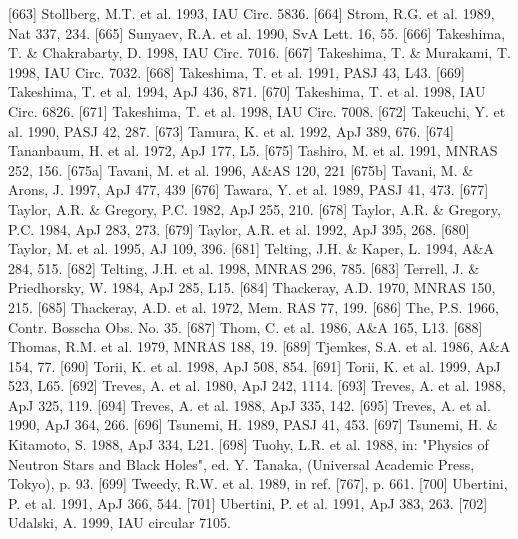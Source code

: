 \documentclass{aa}
\begin{document}
\begin{thebibliography}{}
\bibitem[]{}[663] Stollberg, M.T. et al. 1993, IAU Circ. 5836.
\bibitem[]{}[664] Strom, R.G. et al. 1989, Nat 337, 234.
\bibitem[]{}[665] Sunyaev, R.A. et al. 1990, SvA Lett. 16, 55.
\bibitem[]{}[666] Takeshima, T. \& Chakrabarty, D. 1998, IAU Circ. 7016.
\bibitem[]{}[667] Takeshima, T. \& Murakami, T. 1998, IAU Circ. 7032.
\bibitem[]{}[668] Takeshima, T. et al. 1991, PASJ 43, L43.
\bibitem[]{}[669] Takeshima, T. et al. 1994, ApJ 436, 871.
\bibitem[]{}[670] Takeshima, T. et al. 1998, IAU Circ. 6826.
\bibitem[]{}[671] Takeshima, T. et al. 1998, IAU Circ. 7008.
\bibitem[]{}[672] Takeuchi, Y. et al. 1990, PASJ 42, 287.
\bibitem[]{}[673] Tamura, K. et al. 1992, ApJ 389, 676.
\bibitem[]{}[674] Tananbaum, H. et al. 1972, ApJ 177, L5.
\bibitem[]{}[675] Tashiro, M. et al. 1991, MNRAS 252, 156.
\bibitem[]{}[675a] Tavani, M. et al. 1996, A\&AS 120, 221 
\bibitem[]{}[675b] Tavani, M. \& Arons, J. 1997, ApJ 477, 439
\bibitem[]{}[676] Tawara, Y. et al. 1989, PASJ 41, 473.
\bibitem[]{}[677] Taylor, A.R. \& Gregory, P.C. 1982, ApJ 255, 210.
\bibitem[]{}[678] Taylor, A.R. \& Gregory, P.C. 1984, ApJ 283, 273.
\bibitem[]{}[679] Taylor, A.R. et al. 1992, ApJ 395, 268.
\bibitem[]{}[680] Taylor, M. et al. 1995, AJ 109, 396.
\bibitem[]{}[681] Telting, J.H. \& Kaper, L. 1994, A\&A 284, 515.
\bibitem[]{}[682] Telting, J.H. et al. 1998, MNRAS 296, 785.
\bibitem[]{}[683] Terrell, J. \& Priedhorsky, W. 1984, ApJ 285, L15.
\bibitem[]{}[684] Thackeray, A.D. 1970, MNRAS 150, 215.
\bibitem[]{}[685] Thackeray, A.D. et al. 1972, Mem. RAS 77, 199.
\bibitem[]{}[686] The, P.S. 1966, Contr. Bosscha Obs. No. 35.
\bibitem[]{}[687] Thom, C. et al. 1986, A\&A 165, L13.
\bibitem[]{}[688] Thomas, R.M. et al. 1979, MNRAS 188, 19.
\bibitem[]{}[689] Tjemkes, S.A. et al. 1986, A\&A 154, 77.
\bibitem[]{}[690] Torii, K. et al. 1998, ApJ 508, 854.
\bibitem[]{}[691] Torii, K. et al. 1999, ApJ 523, L65.
\bibitem[]{}[692] Treves, A. et al. 1980, ApJ 242, 1114.
\bibitem[]{}[693] Treves, A. et al. 1988, ApJ 325, 119.
\bibitem[]{}[694] Treves, A. et al. 1988, ApJ 335, 142.
\bibitem[]{}[695] Treves, A. et al. 1990, ApJ 364, 266.
\bibitem[]{}[696] Tsunemi, H. 1989, PASJ 41, 453.
\bibitem[]{}[697] Tsunemi, H. \& Kitamoto, S. 1988, ApJ 334, L21.
\bibitem[]{}[698] Tuohy, L.R. et al. 1988, in: "Physics of Neutron Stars and Black Holes", 
                                  ed. Y. Tanaka, (Universal Academic Press, Tokyo), p. 93.
\bibitem[]{}[699] Tweedy, R.W. et al. 1989, in ref. [767], p. 661.
\bibitem[]{}[700] Ubertini, P. et al. 1991, ApJ 366, 544.
\bibitem[]{}[701] Ubertini, P. et al. 1991, ApJ 383, 263.
\bibitem[]{}[702] Udalski, A. 1999, IAU circular 7105.

\end{thebibliography}
\end{document}
